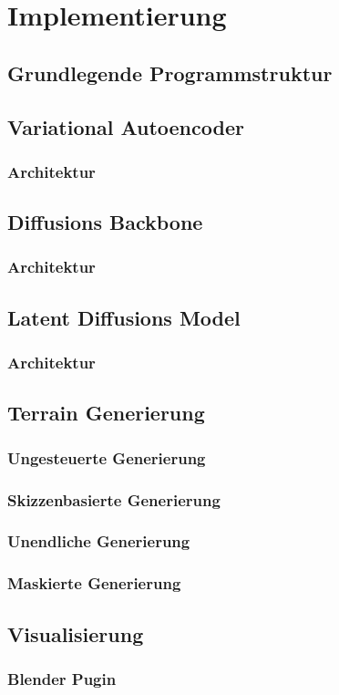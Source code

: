\chapter{Implementierung}

\section {Grundlegende Programmstruktur}

\section {Variational Autoencoder}

\subsection{Architektur}

\section {Diffusions Backbone}

\subsection{Architektur}


\section {Latent Diffusions Model}

\subsection{Architektur}


\section {Terrain Generierung}
\subsection {Ungesteuerte Generierung}
\subsection {Skizzenbasierte Generierung}
\subsection {Unendliche Generierung}
\subsection {Maskierte Generierung}

\section {Visualisierung}
\subsection {Blender Pugin}
